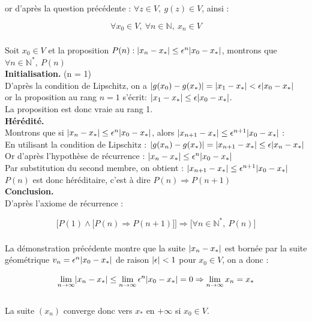 \documentclass{article}
\DeclarePairedDelimiter\abs{\lvert}{\rvert}%
\begin{document}
or d'après la question précédente : $\forall z \in V, \ g(z) \in V$, ainsi :

$$\forall x_0 \in V, \ \forall n \in \mathbb{N}, \ x_n \in V$$


\subsubsection{}

Soit $x_0 \in V$ et la proposition $P(n) : \abs{x_n - x_*} \leq \epsilon^n \abs{x_0 - x_*}$,
montrons que $\forall n \in \mathbb{N}^*, \ P(n)$ \\


\textbf{Initialisation.} (n = 1) \\

D'après la condition de Lipschitz, on a $\abs{g(x_0) - g(x_*)} = \abs{x_1 - x_*} < \epsilon \abs{x_0 - x_*}$ \\
or la proposition au rang $n = 1$ s'écrit: $\abs{x_1 - x_*} \leq \epsilon \abs{x_0 - x_*}$. \\

La proposition est donc vraie au rang 1. \\

\textbf{Hérédité.} \\ 

Montrons que si $\abs{x_n - x_*} \leq \epsilon^n \abs{x_0 - x_*}$, alors 
$\abs{x_{n + 1} - x_*} \leq \epsilon^{n + 1} \abs{x_0 - x_*}$ : \\

En utilisant la condition de Lipschitz : $\abs{g(x_n) - g(x_*)} = \abs{x_{n + 1} - x_*} \leq \epsilon \abs{x_n - x_*}$ \\

Or d'après l'hypothèse de récurrence : $\abs{x_n - x_*} \leq \epsilon^n \abs{x_0 - x_*}$ \\

Par substitution du second membre, on obtient : $\abs{x_{n + 1} - x_*} \leq \epsilon^{n + 1} \abs{x_0 - x_*}$ \\

$P(n)$ est donc héréditaire, c'est à dire $P(n) \Rightarrow P(n + 1)$ \\

\textbf{Conclusion.} \\

D'après l'axiome de récurrence :

$$\Big[P(1) \land \big[P(n) \Rightarrow P(n + 1)\big]\Big] \Rightarrow
\big[\forall n \in \mathbb{N}^*, \ P(n) \big]$$

\subsubsection{}

La démonstration précédente montre que la suite $\abs{x_n - x_*}$ est bornée par la suite géométrique
$v_n = \epsilon^n \abs{x_0 - x_*}$ de raison $\abs{\epsilon} < 1$ pour $x_0 \in V$, on a donc : 

$$\lim_{n \to \infty} \abs{x_n - x_*} \leq \lim_{n \to \infty} \epsilon^n \abs{x_0 - x_*} = 0 \Rightarrow \lim_{n \to \infty} x_n = x_*$$ \\

La suite $(x_n)$ converge donc vers $x_*$ en $+\infty$ si $x_0 \in V$.
\end{document}
